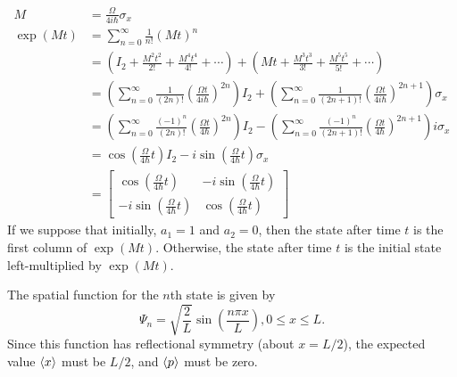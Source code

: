\documentclass{article}
\begin{document}
\bigskip
\noindent{}\bigskip\par
\begin{align*}
    M &= \frac{\Omega}{4i\hbar} \sigma_x \\
    \exp(Mt) &= \sum_{n=0}^\infty \frac{1}{n!} (Mt)^n \\
             &= \left( I_2 + \frac{M^2t^2}{2!} + \frac{M^4t^4}{4!} + \cdots \right) + \left( Mt + \frac{M^3t^3}{3!} + \frac{M^5t^5}{5!} + \cdots \right) \\
             &= \left( \sum_{n=0}^\infty \frac{1}{(2n)!} \left( \frac{\Omega t}{4 i \hbar} \right)^{2n} \right) I_2 + \left( \sum_{n=0}^\infty \frac{1}{(2n+1)!} \left( \frac{\Omega t}{4 i \hbar} \right)^{2n+1} \right) \sigma_x \\
             &= \left( \sum_{n=0}^\infty \frac{(-1)^n}{(2n)!} \left( \frac{\Omega t}{4 \hbar} \right)^{2n} \right) I_2 - \left( \sum_{n=0}^\infty \frac{(-1)^n}{(2n+1)!} \left( \frac{\Omega t}{4 \hbar} \right)^{2n+1} \right) i \sigma_x \\
             &= \cos \left( \frac{\Omega}{4 \hbar} t \right) I_2 - i \sin \left( \frac{\Omega}{4 \hbar} t \right) \sigma_x \\
             &= \begin{bmatrix}
                 \cos \left( \frac{\Omega}{4 \hbar} t \right) & - i \sin \left( \frac{\Omega}{4 \hbar} t \right) \\
                 - i \sin \left( \frac{\Omega}{4 \hbar} t \right) & \cos \left( \frac{\Omega}{4 \hbar} t \right)
             \end{bmatrix}
\end{align*}
If we suppose that initially, $a_1=1$ and $a_2=0$, then the state after time $t$ is the first column of $\exp(Mt)$. Otherwise, the state after time $t$ is the initial state left-multiplied by $\exp(Mt)$.

\bigskip
\noindent{}\bigskip\par
The spatial function for the $n$th state is given by
\[ \Psi_n = \sqrt{ \frac{2}{L}} \sin \left( \frac{n\pi x}{L} \right), 0 \leq x \leq L. \]
Since this function has reflectional symmetry (about $x = L/2$), the expected value $\left\langle x \right\rangle$ must be $L/2$, and $\left\langle p \right\rangle$ must be zero.
\end{document}
